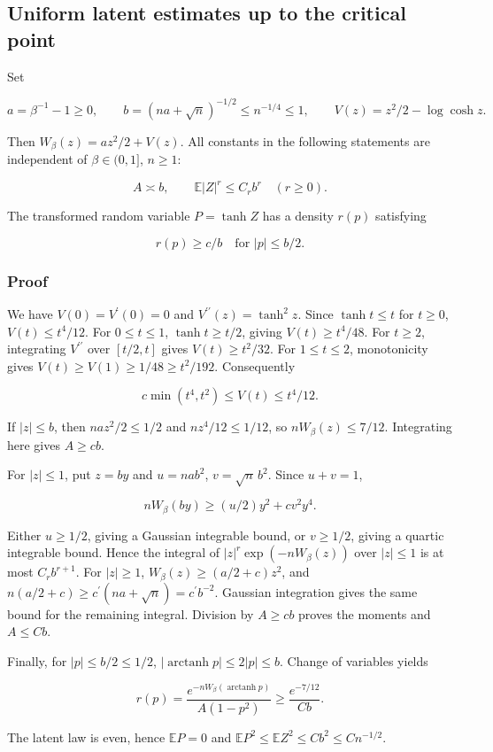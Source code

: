 \subsection{Uniform latent estimates up to the critical point}\label{cw:uniform-latent-estimates-throughout-0betale1}

Set

\[
a=\beta^{-1}-1\ge0,\qquad
b=(na+\sqrt n)^{-1/2}\le n^{-1/4}\le1,
\qquad V(z)=z^2/2-\log\cosh z.
\]

Then \(W_\beta(z)=az^2/2+V(z)\). All constants in the following statements are independent of \(\beta\in(0,1]\), \(n\ge1\):

\[
A\asymp b,\qquad
\mathbb E|Z|^r\le C_r b^r\quad(r\ge0).
\]

The transformed random variable \(P=\tanh Z\) has a density $r(p)$ satisfying

\[
\boxed{r(p)\ge c/b\quad\text{for } |p|\le b/2.}
\]

\subsubsection{Proof}\label{cw:proof}

We have \(V(0)=V^{\prime}(0)=0\) and \(V^{\prime\prime}(z)=\tanh^2z\). Since \(\tanh t\le t\) for \(t\ge0\), \(V(t)\le t^4/12\). For \(0\le t\le1\), \(\tanh t\ge t/2\), giving \(V(t)\ge t^4/48\). For \(t\ge2\), integrating \(V^{\prime\prime}\) over \([t/2,t]\) gives \(V(t)\ge t^2/32\). For \(1\le t\le2\), monotonicity gives \(V(t)\ge V(1)\ge1/48\ge t^2/192\). Consequently

\[
c\min(t^4,t^2)\le V(t)\le t^4/12.
\]

If \(|z|\le b\), then \(na z^2/2\le1/2\) and \(nz^4/12\le1/12\), so \(nW_\beta(z)\le7/12\). Integrating here gives \(A\ge cb\).

For \(|z|\le1\), put \(z=by\) and \(u=na b^2\), \(v=\sqrt n\,b^2\). Since \(u+v=1\),

\[
nW_\beta(by)\ge (u/2)y^2+c v^2y^4.
\]

Either \(u\ge1/2\), giving a Gaussian integrable bound, or \(v\ge1/2\), giving a quartic integrable bound. Hence the integral of \(|z|^r\exp(-nW_\beta(z))\) over \(|z|\le1\) is at most \(C_r b^{r+1}\). For \(|z|\ge1\), \(W_\beta(z)\ge(a/2+c)z^2\), and \(n(a/2+c)\ge c^{\prime}(na+\sqrt n)=c^{\prime}b^{-2}\). Gaussian integration gives the same bound for the remaining integral. Division by \(A\ge cb\) proves the moments and \(A\le Cb\).

Finally, for \(|p|\le b/2\le1/2\), \(|\operatorname{arctanh}p|\le2|p|\le b\). Change of variables yields

\[
r(p)=\frac{e^{-nW_\beta(\operatorname{arctanh}p)}}{A(1-p^2)}
\ge\frac{e^{-7/12}}{Cb}.
\]

The latent law is even, hence \(\mathbb E P=0\) and \(\mathbb E P^2\le\mathbb E Z^2\le Cb^2\le Cn^{-1/2}\).
